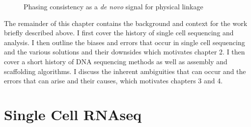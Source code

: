 \begin{figure}[htbp!]
\begin{centering}

\caption{Phasing consistency as a \textit{de novo} signal for physical linkage}\label{fig:phasstools}
\end{centering}

\end{figure}

\par{
The remainder of this chapter contains the background and context for the work briefly described above. I first cover the history of single cell sequencing and analysis. I then outline the biases and errors that occur in single cell sequencing and the various solutions and their downsides which motivates chapter 2. I then cover a short history of DNA sequencing methods as well as assembly and scaffolding algorithms. I discuss the inherent ambiguities that can occur and the errors that can arise and their causes, which motivates chapters 3 and 4.
}

\section{Single Cell RNAseq}

